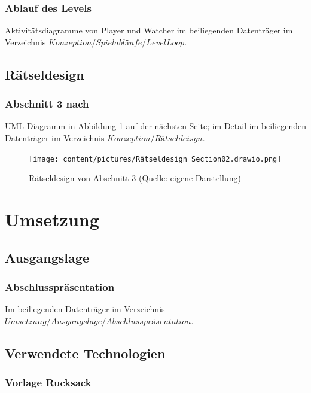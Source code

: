 \documentclass[
	12pt,
	a4paper,
	bibtotoc,
	cleardoubleempty, 
	idxtotoc,
	ngerman,
	openright
	final,
	listof=nochaptergap,
	]{scrbook}
\begin{document}
\begin{appendices}
\subsubsection{Ablauf des Levels}\label{sec:append_levelloop}
Aktivitätsdiagramme von Player und Watcher im beiliegenden Datenträger im Verzeichnis $Konzeption/Spielabläufe/LevelLoop$.

\newpage

\subsection{Rätseldesign}

\subsubsection{Abschnitt 3 nach \cite{tim_schafer_grim_1996}}\label{sec:append_riddles_part_3}
UML-Diagramm in Abbildung \ref{fig:riddle-design-section02-uml} auf der nächsten Seite; im Detail im beiliegenden Datenträger im Verzeichnis $Konzeption/Rätseldeisgn$.

\begin{figure}[ht]
\centering
\texttt{[image: content/pictures/Rätseldesign\_Section02.drawio.png]}
\caption{Rätseldesign von Abschnitt 3 (Quelle: eigene Darstellung)}
\label{fig:riddle-design-section02-uml}
\end{figure}

\clearpage

\section{Umsetzung}

\subsection{Ausgangslage}

\subsubsection{Abschlusspräsentation}\label{sec:append_realisation_ausgangslage_presentation}
Im beiliegenden Datenträger im Verzeichnis $Umsetzung/Ausgangslage/Abschlusspräsentation$.

\subsection{Verwendete Technologien}

\subsubsection{Vorlage Rucksack}\label{sec:append_realisation_vorlage_rucksack}


\end{appendices}
\end{document}

